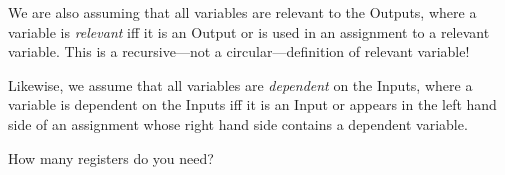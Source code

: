 \documentclass[12pt,twoside]{article}
\begin{document}
\begin{problem}{16}
{  We are also assuming that all variables are relevant to the Outputs,
  where a variable is \emph{relevant} iff it
  is an Output or is used in an assignment to a relevant variable.
  This is a recursive---not a circular---definition of relevant
  variable!

  Likewise, we assume that all variables are \emph{dependent} on the Inputs, where a variable is
  dependent on the Inputs iff it is an Input or appears in the left
  hand side of an assignment whose right hand side contains a
  dependent variable.
}

 How many registers
do you need?


\eparts
\end{problem}
\end{document}

